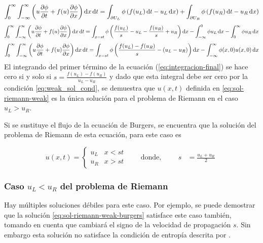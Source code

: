 \documentclass[12pt]{article}
\begin{document}
	\begin{equation}
		\int_{0}^{\infty}\int_{-\infty}^{\infty}\left( u\pdv{\phi}{t} + f(u)\pdv{\phi}{x}\right)\dd{x}\dd{t}=\int_{\partial U_L}\phi \left( f(u_L)\dd{t} - u_L \dd{x}\right) + \int_{\partial U_R}\phi \left( f(u_R)\dd{t} - u_R \dd{x}\right)
	\end{equation}
	\begin{equation}
		\int_{0}^{\infty}\int_{-\infty}^{\infty}\left( u\pdv{\phi}{t} + f(u)\pdv{\phi}{x}\right)\dd{x}\dd{t}=\int_{x=st}\phi \left(\frac{f(u_L)}{s} - u_L  - \frac{f(u_R)}{s} + u_R  \right)\dd{x}-\int_{-\infty}^{0}\phi u_L \dd{x} -\int_{0}^{\infty}\phi u_R \dd{x}
	\end{equation}
	\begin{equation}
		\int_{0}^{\infty}\int_{-\infty}^{\infty}\left( u\pdv{\phi}{t} + f(u)\pdv{\phi}{x}\right)\dd{x}\dd{t}=\int_{x=st}\phi \left(\frac{f(u_L)-f(u_R)}{s} - (u_L-u_R) \right)\dd{x} - \int_{-\infty}^{\infty}\phi(x,0)u(x,0) \dd{x}
		\label{eq:integracion-final}
	\end{equation}
	El integrando del primer término de la ecuación (\ref{eq:integracion-final}) se hace cero si y solo si $s = \frac{f(u_L) - f(u_R)}{u_L - u_R}$ y dado que esta integral debe ser cero por la condición \ref{eq:weak_sol_cond}, se demuestra que $u(x,t)$ definida en \ref{eq:sol-riemann-weak} es la única solución para el problema de Riemann en el caso $u_L > u_R$.
	
	Si se sustituye el flujo de la ecuación de Burgers, se encuentra que la solución del problema de Riemann de esta ecuación, para este caso es 
	
	\begin{equation}
		u(x,t) =
		\begin{cases}
			u_{L} & x < st \\
			u_{R} & x > st
		\end{cases}
		\qquad \text{donde,}
		\qquad
		\begin{aligned}
			s &= \frac{u_{L} + u_{R}}{2}
		\end{aligned}
		\label{eq:sol-riemann-weak-burgers}
	\end{equation}

	\subsubsection{Caso $u_L < u_R$ del problema de Riemann}
	
	Hay múltiples soluciones débiles para este caso. Por  ejemplo, se puede demostrar que la solución \ref{eq:sol-riemann-weak-burgers} satisface este caso también, tomando en cuenta que cambiará el signo de la velocidad de propagación $s$. Sin embargo esta solución no satisface la condición de entropía descrita por \cite{Cameron}.
	
\end{document}

